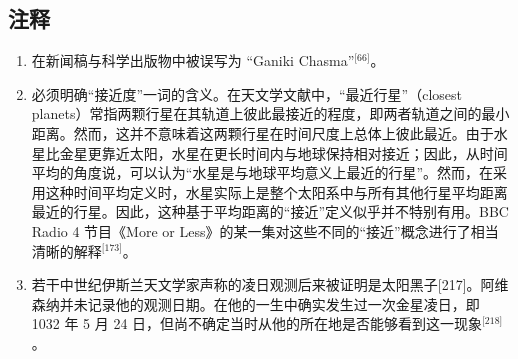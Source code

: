 \subsection{注释 } 
\begin{enumerate}
\item 在新闻稿与科学出版物中被误写为 “Ganiki Chasma”\(^\text{[66]}\)。  
\item 必须明确“接近度”一词的含义。在天文学文献中，“最近行星”（closest planets）常指两颗行星在其轨道上彼此最接近的程度，即两者轨道之间的最小距离。然而，这并不意味着这两颗行星在时间尺度上总体上彼此最近。由于水星比金星更靠近太阳，水星在更长时间内与地球保持相对接近；因此，从时间平均的角度说，可以认为“水星是与地球平均意义上最近的行星”。然而，在采用这种时间平均定义时，水星实际上是整个太阳系中与所有其他行星平均距离最近的行星。因此，这种基于平均距离的“接近”定义似乎并不特别有用。BBC Radio 4 节目《More or Less》的某一集对这些不同的“接近”概念进行了相当清晰的解释\(^\text{[173]}\)。  
\item 若干中世纪伊斯兰天文学家声称的凌日观测后来被证明是太阳黑子[217]。阿维森纳并未记录他的观测日期。在他的一生中确实发生过一次金星凌日，即 1032 年 5 月 24 日，但尚不确定当时从他的所在地是否能够看到这一现象\(^\text{[218]}\)。
\end{enumerate}
